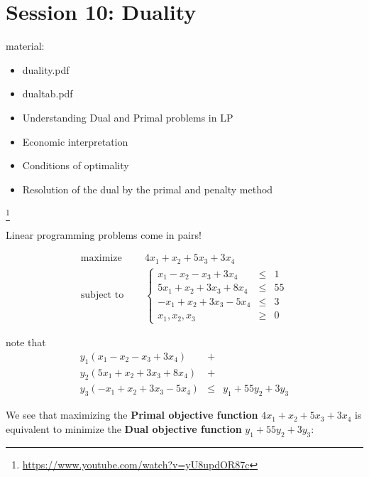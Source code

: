 \section{Session 10: Duality}

material: 
\begin{itemize}
    \item duality.pdf
    \item dualtab.pdf
\end{itemize}



\begin{itemize}
  \item Understanding Dual and Primal problems in LP
  \item Economic interpretation
  \item Conditions of optimality
  \item Resolution of the dual by the primal and penalty method
\end{itemize}

\footnote{\url{https://www.youtube.com/watch?v=yU8updOR87c}}

  Linear programming problems come in pairs!

  \begin{equation*}
    \begin{aligned}
      \text{maximize  } \quad & 4x_1 + x_2 +5x_3 +3x_4 \\
      \text{subject to }\quad &
      \left\{
      \begin{array}{rcl}
        x_1 - x_2 -x_3 +3x_4 &\leq &1 \\
        5x_1 + x_2 +3x_3 +8x_4 &\leq &55 \\
        -x_1 + x_2 +3x_3 -5x_4 &\leq &3 \\
        x_1,x_2,x_3 &\geq& 0
      \end{array}
      \right.
    \end{aligned}
  \end{equation*}

note that
\begin{eqnarray*}
  y_1(x_1 - x_2 -x_3 +3x_4)&+&\\y_2(5x_1 + x_2 +3x_3 +8x_4)&+&\\y_3(-x_1 + x_2 +3x_3 -5x_4) &\leq& y_1+55y_2+3y_3
\end{eqnarray*}


We see that maximizing the {\bf Primal objective function} $4x_1 + x_2 +5x_3 +3x_4$ is
  equivalent to minimize the {\bf Dual objective function} $y_1+55y_2+3y_3$:

